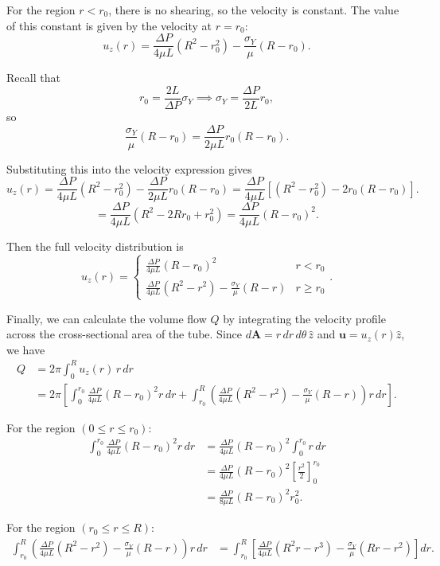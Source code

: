 \documentclass[12pt, a4paper]{article}
\numberwithin{equation}{section}
\begin{document}
For the region $r < r_0$, there is no shearing, so the velocity is constant. The value of this constant is given by the velocity at $r = r_0$:
\[
	u_z(r) = \frac{\Delta P}{4\mu L}(R^2 - r_0^2) - \frac{\sigma_Y}{\mu}(R - r_0).
\]

Recall that
\[
	r_0 = \frac{2L}{\Delta P}\sigma_Y \implies \sigma_Y = \frac{\Delta P}{2L}r_0,
\]
so
\[
	\frac{\sigma_Y}{\mu}(R - r_0)
	=
	\frac{\Delta P}{2\mu L}r_0(R - r_0).
\]

Substituting this into the velocity expression gives
\[
	u_z(r)
	=
	\frac{\Delta P}{4\mu L}(R^2 - r_0^2)
	-
	\frac{\Delta P}{2\mu L}r_0(R - r_0)
	=
	\frac{\Delta P}{4\mu L}
	\left[
	(R^2 - r_0^2) - 2r_0(R - r_0)
	\right].
\]
\[
	=
	\frac{\Delta P}{4\mu L}
	(R^2 - 2Rr_0 + r_0^2)
	=
	\frac{\Delta P}{4\mu L}
	(R - r_0)^2.
\]

Then the full velocity distribution is
\[
	\boxed{u_z(r) = \begin{cases}
		\frac{\Delta P}{4\mu L}(R - r_0)^2 & r < r_0 \\
		\frac{\Delta P}{4\mu L}(R^2 - r^2) - \frac{\sigma_Y}{\mu}(R - r) & r \geq r_0
	\end{cases}}.
\]

Finally, we can calculate the volume flow $Q$ by integrating the velocity profile across the cross-sectional area of the tube. Since $d\mathbf{A} = r\,dr\,d\theta\,\hat{z}$ and $\mathbf{u} = u_z(r)\hat{z}$, we have
\begin{align*}
Q
&= 2\pi \int_0^R u_z(r)\, r\,dr \\
&= 2\pi \left[
\int_0^{r_0} \frac{\Delta P}{4\mu L}(R - r_0)^2 r\,dr
+ \int_{r_0}^R \left(\frac{\Delta P}{4\mu L}(R^2 - r^2) - \frac{\sigma_Y}{\mu}(R - r)\right) r\,dr
\right].
\end{align*}

For the region $(0 \le r \le r_0)$:
\begin{align*}
\int_0^{r_0} \frac{\Delta P}{4\mu L}(R - r_0)^2 r\,dr
&= \frac{\Delta P}{4\mu L}(R - r_0)^2 \int_0^{r_0} r\,dr \\
&= \frac{\Delta P}{4\mu L}(R - r_0)^2 \left[\frac{r^2}{2}\right]_0^{r_0} \\
&= \frac{\Delta P}{8\mu L}(R - r_0)^2 r_0^2.
\end{align*}

For the region $(r_0 \le r \le R)$:
\begin{align*}
\int_{r_0}^R \left(\frac{\Delta P}{4\mu L}(R^2 - r^2) - \frac{\sigma_Y}{\mu}(R - r)\right) r\,dr
&= \int_{r_0}^R
\left[
\frac{\Delta P}{4\mu L}(R^2 r - r^3)
- \frac{\sigma_Y}{\mu}(Rr - r^2)
\right]dr.
\end{align*}
\end{document}
